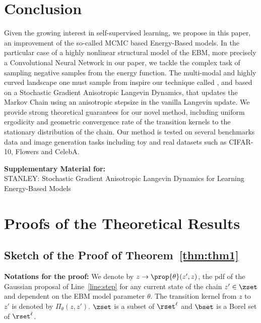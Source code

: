 \documentclass{article} %
\begin{document}
\section{Conclusion}\label{sec:conclusion}

Given the growing interest in self-supervised learning, we propose in this paper, an improvement of the so-called MCMC based Energy-Based models.
In the particular case of a highly nonlinear structural model of the EBM, more precisely a Convolutional Neural Network in our paper, we tackle the complex task of sampling negative samples from the energy function.
The multi-modal and highly curved landscape one must sample from inspire our technique called \algo, and based on a Stochastic Gradient Anisotropic Langevin Dynamics, that updates the Markov Chain using an anisotropic stepsize in the vanilla Langevin update.
We provide strong theoretical guarantees for our novel method, including uniform ergodicity and geometric convergence rate of the transition kernels to the stationary distribution of the chain.
Our method is tested on several benchmarks data and image generation tasks including toy and real datasets such as CIFAR-10, Flowers and CelebA.


\clearpage


\newpage

\appendix

\onecolumn

\begin{center}
{\Large \textbf{Supplementary Material for:}\\
STANLEY: Stochastic Gradient Anisotropic Langevin Dynamics for Learning Energy-Based Models \par}
      
\end{center}      

\medskip
\section{Proofs of the Theoretical Results}\label{app:proofs}


\subsection{Sketch of the Proof of Theorem~\ref{thm:thm1}}

\textbf{Notations for the proof:}
We denote by $z \to \prop{\theta}(z',z)$, the pdf of the Gaussian proposal of Line~\ref{line:step} for any current state of the chain $z' \in \zset$ and dependent on the EBM model parameter $\theta$.
The transition kernel from $z$ to $z'$ is denoted by $\Pi_\theta(z, z')$.
$\zset$ is a subset of $\rset^\ell$ and $\bset$ is a Borel set of $\rset^\ell$.
\end{document}
